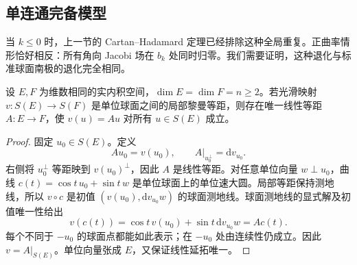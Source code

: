 \subsection{单连通完备模型}
\label{g3:subsec:0902:02}

当 \(k\le0\) 时，上一节的 Cartan--Hadamard 定理已经排除这种全局重复。正曲率情形恰好相反：所有角向 Jacobi 场在 \(b_k\) 处同时归零。我们需要证明，这种退化与标准球面南极的退化完全相同。

\begin{lemma}\label{g3:lem:round-unit-sphere-isometry}
	设 \(E,F\) 为维数相同的实内积空间，\(\dim E=\dim F=n\ge2\)。若光滑映射 \(v:S(E)\to S(F)\) 是单位球面之间的局部黎曼等距，则存在唯一线性等距 \(A:E\to F\)，使 \(v(u)=Au\) 对所有 \(u\in S(E)\) 成立。
\end{lemma}
\begin{proof}
	固定 \(u_0\in S(E)\)。定义
	\[
		Au_0=v(u_0),\qquad
		A|_{u_0^\perp}=\mathrm dv_{u_0}.
	\]
	右侧将 \(u_0^\perp\) 等距映到 \(v(u_0)^\perp\)，因此 \(A\) 是线性等距。对任意单位向量 \(w\perp u_0\)，曲线
	\(c(t)=\cos t\,u_0+\sin t\,w\)
	是单位球面上的单位速大圆。局部等距保持测地线，所以 \(v\circ c\) 是初值
	\((v(u_0),\mathrm dv_{u_0}w)\)
	的球面测地线。球面测地线的显式解及初值唯一性给出
	\[
		v(c(t))=\cos t\,v(u_0)+\sin t\,\mathrm dv_{u_0}w=Ac(t).
	\]
	每个不同于 \(-u_0\) 的球面点都能如此表示；在 \(-u_0\) 处由连续性仍成立。因此 \(v=A|_{S(E)}\)。单位向量张成 \(E\)，又保证线性延拓唯一。
\end{proof}

